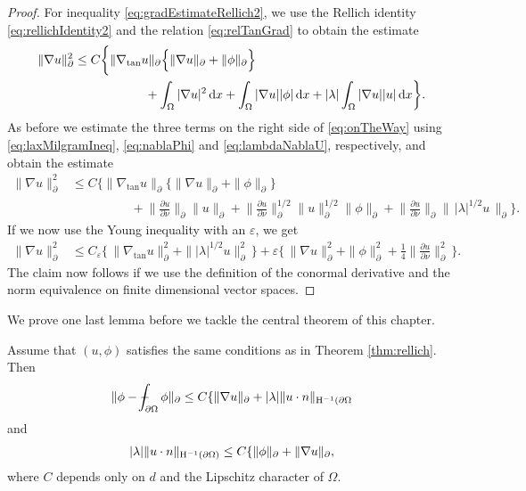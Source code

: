 \begin{proof}
  For inequality \eqref{eq:gradEstimateRellich2}, we use the Rellich identity \eqref{eq:rellichIdentity2} and the relation \eqref{eq:relTanGrad} to obtain the estimate
  \begin{align}
    \label{eq:onTheWay}
    \begin{alignedat}{1}
    \| \nabla u\|_\partial^2 
    &\leq C \bigg\{ \|\nabla_{\mathrm{tan}} u\|_\partial 
    \Big\{ \|\nabla u\|_\partial + \|\phi\|_\partial \Big\}   \\
    &\hspace{2cm} + \int_\Omega |\nabla u|^2 \, {\operatorname{d}\!{x}} + \int_\Omega |\nabla u| |\phi| \, {\operatorname{d}\!{x}} + |\lambda| \int_\Omega |\nabla u| |u|\, {\operatorname{d}\!{x}} \bigg\}.
  \end{alignedat}
  \end{align}
  As before we estimate the three terms on the right side of \eqref{eq:onTheWay} using \eqref{eq:laxMilgramIneq}, \eqref{eq:nablaPhi} and \eqref{eq:lambdaNablaU}, respectively, and obtain the estimate
  \begin{align*}
    \| \nabla u\|_\partial^2 
    &\leq C \bigg\{ \|\nabla_{\mathrm{tan}} u\|_\partial 
    \Big\{ \|\nabla u\|_\partial + \|\phi\|_\partial \Big\}   \\
    &\hspace{2cm} + \Big\| \frac{\partial u}{\partial \nu} \Big\|_\partial \| u\|_\partial
    + \Big\| \frac{\partial u}{\partial \nu} \Big\|_\partial^{1/2} \|u\|_\partial^{1/2} \|\phi\|_\partial + \Big\| \frac{\partial u}{\partial \nu} \Big\|_\partial \big\|\, |\lambda|^{1/2} u \, \big\|_\partial \bigg\}.
  \end{align*}
  If we now use the Young inequality with an $\varepsilon$, we get
  \begin{align*}
    \|\nabla u\|_\partial^2 
    &\leq C_\varepsilon \big\{ \, \|\nabla_{\mathrm{tan}} u\|_\partial^2 + \| |\lambda|^{1/2} u\|_\partial^2 \, \big\}  + \varepsilon \bigg\{ \, \|\nabla u\|_\partial^2 + \|\phi\|_\partial^2 + \frac{1}{4}\Big\|\frac{\partial u}{\partial \nu} \Big\|_\partial^2 \, \bigg\}.
  \end{align*}
  The claim now follows if we use the definition of the conormal derivative and the norm equivalence on finite dimensional vector spaces.
\end{proof}

We prove one last lemma before we tackle the central theorem of this chapter.

\begin{lem}
  Assume that $(u,\phi)$ satisfies the same conditions as in Theorem \ref{thm:rellich}.
  Then
  \begin{align}
    \label{eq:phiDashintPhi}
    \| \phi - \dashint_{\partial\Omega} \phi \|_\partial \leq C \{ \|\nabla u\|_\partial + |\lambda| \|u\cdot n\|_{\HH^{-1}(\partial\Omega}
  \end{align}
  and
  \begin{align}
    \label{eq:lambdaun}
    |\lambda| \| u\cdot n \|_{\mathrm{H}^{-1}(\partial\Omega)} \leq C \{ \|\phi\|_\partial + \|\nabla u\|_\partial,
  \end{align}
  where $C$ depends only on $d$ and the Lipschitz character of $\Omega$.
\end{lem}

